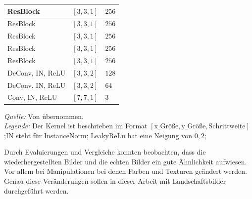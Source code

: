 \begin{table}[]
\begin{center}
\begin{minipage}{.5\linewidth}
\begin{tabular}{lcl}
 				\midrule
 				ResBlock & $[3,3,1]$& $256$ \\
 				\midrule
 				ResBlock & $[3,3,1]$& $256$ \\
 				\midrule
 				ResBlock & $[3,3,1]$& $256$ \\
 				\midrule
 				ResBlock & $[3,3,1]$& $256$ \\
 				\midrule
 				ResBlock & $[3,3,1]$& $256$ \\
 				\midrule
 				DeConv, IN, ReLU & $[3,3,2]$ & $128$\\
 				\midrule
 				DeConv, IN, ReLU & $[3,3,2]$ & $64$\\
 				\midrule
 				Conv, IN, ReLU & $[7,7,1]$ & $3$\\
 				\bottomrule
 			\end{tabular}
 		\end{minipage} 
 	\end{center}
 	\begin{center}
 		\bigskip
 		\emph{Quelle:} Von \cite[]{zhu_unpaired_2020} übernommen.\\
 		\emph{Legende:} Der Kernel ist beschrieben im Format $[\text{x\_Größe},
 		\text{y\_Größe}, \text{Schrittweite}]$;IN steht für InstanceNorm; LeakyReLu hat eine Neigung von $0,2$;
 	\end{center}
 \end{table}
 
 
 Durch Evaluierungen und Vergleiche konnten \citeauthor{zhu_unpaired_2020} beobachten, dass die wiederhergestellten Bilder und die echten Bilder ein gute Ähnlichkeit aufwiesen. Vor allem bei Manipulationen bei denen Farben und Texturen geändert werden. Genau diese Veränderungen sollen in dieser Arbeit mit Landschaftsbilder durchgeführt werden. 
 
